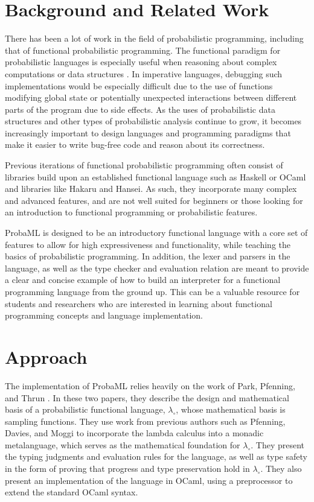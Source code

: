 \documentclass[pageno]{jpaper}
\begin{document}
\section{Background and Related Work}
There has been a lot of work in the field of probabilistic programming, including that of functional probabilistic programming. The functional paradigm for probabilistic languages is especially useful when reasoning about complex computations or data structures \cite{functional_pearls}. In imperative languages, debugging such implementations would be especially difficult due to the use of functions modifying global state or potentially unexpected interactions between different parts of the program due to side effects. As the uses of probabilistic data structures and other types of probabilistic analysis continue to grow, it becomes increasingly important to design languages and programming paradigms that make it easier to write bug-free code and reason about its correctness.

Previous iterations of functional probabilistic programming often consist of libraries build upon an established functional language such as Haskell or OCaml and libraries like Hakaru and Hansei. As such, they incorporate many complex and advanced features, and are not well suited for beginners or those looking for an introduction to functional programming or probabilistic features.

ProbaML is designed to be an introductory functional language with a core set of features to allow for high expressiveness and functionality, while teaching the basics of probabilistic programming. In addition, the lexer and parsers in the language, as well as the type checker and evaluation relation are meant to provide a clear and concise example of how to build an interpreter for a functional programming language from the ground up. This can be a valuable resource for students and researchers who are interested in learning about functional programming concepts and language implementation.

\section{Approach}
The implementation of ProbaML relies heavily on the work of Park, Pfenning, and Thrun \cite{pfenning_short,pfenning_long}. In these two papers, they describe the design and mathematical basis of a probabilistic functional language, $\lambda_{\circ}$, whose mathematical basis is sampling functions. They use work from previous authors such as Pfenning, Davies, and Moggi \cite{pfenning_davies_2001,moggi,park_calc_prob} to incorporate the lambda calculus into a monadic metalanguage, which serves as the mathematical foundation for $\lambda_{\circ}$. They present the typing judgments and evaluation rules for the language, as well as type safety in the form of proving that progress and type preservation hold in $\lambda_{\circ}$. They also present an implementation of the language in OCaml, using a preprocessor to extend the standard OCaml syntax.
\end{document}
